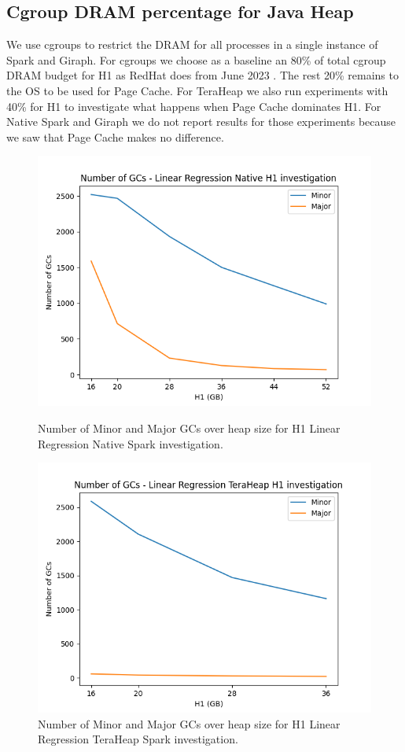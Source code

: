 \subsection{Cgroup DRAM percentage for Java Heap}
We use cgroups \cite{cgroups} to restrict the DRAM for all processes in a single instance of Spark and Giraph.
For cgroups we choose as a baseline an 80\% of total cgroup DRAM budget for H1 as RedHat does from June 2023 \cite{redhatblog}.
The rest 20\% remains to the OS to be used for Page Cache.
For TeraHeap we also run experiments with 40\% for H1 to investigate what happens when Page Cache dominates H1.
For Native Spark and Giraph we do not report results for those experiments because we saw that Page Cache makes no difference.


\iffalse
\begin{figure}[thbp]
	\centering
    \includegraphics[width=\linewidth]{./fig/gcs_linr_h1_native.png}
    \caption{Number of Minor and Major GCs over heap size for H1 Linear Regression Native
    Spark investigation.}
    \label{fig:gcs_linr_h1_native}

    \includegraphics[width=\linewidth]{./fig/gcs_linr_h1_th.png}
    \caption{Number of Minor and Major GCs over heap size for H1 Linear Regression TeraHeap
    Spark investigation.}
    \label{fig:gcs_linr_h1_th}
\end{figure}

